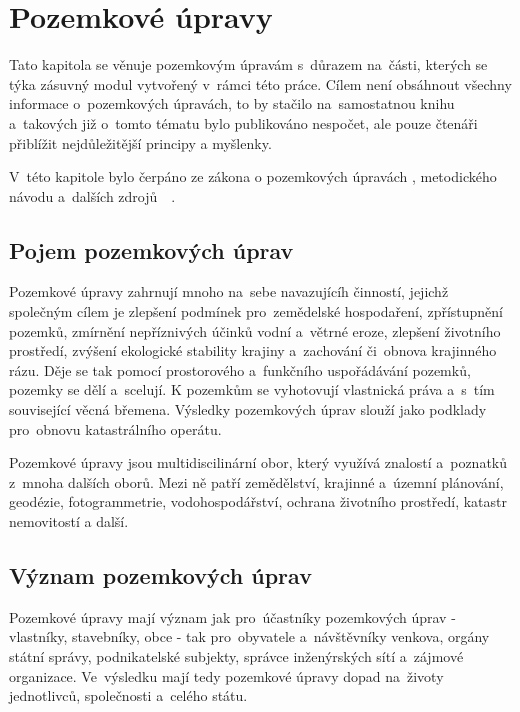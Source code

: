 \chapter{Pozemkové úpravy}
\label{pu}

Tato kapitola se věnuje pozemkovým úpravám s~důrazem na~části, kterých se týka zásuvný modul vytvořený v~rámci této práce. Cílem není obsáhnout všechny informace o~pozemkových úpravách, to by stačilo na~samostatnou knihu a~takových již o~tomto tématu bylo publikováno nespočet, ale pouze čtenáři přiblížit nejdůležitější principy a myšlenky.

V~této kapitole bylo čerpáno ze zákona o pozemkových úpravách \citep{pu_zakon}, metodického návodu \citep{metodicky_navod} a~dalších zdrojů~\citep{pu_skripta}~\citep{pu_cr}.

\section{Pojem pozemkových úprav}
\label{pojem_pu}

Pozemkové úpravy zahrnují mnoho na~sebe navazujícíh činností, jejichž společným cílem je zlepšení podmínek pro~zemědelské hospodaření, zpřístupnění pozemků, zmírnění nepříznivých účinků vodní a~větrné eroze, zlepšení životního prostředí, zvýšení ekologické stability krajiny a~zachování či~obnova krajinného rázu. Děje se tak pomocí prostorového a~funkčního uspořádávání pozemků, pozemky se dělí a~scelují. K pozemkům se vyhotovují vlastnická práva a~s~tím související věcná břemena. Výsledky pozemkových úprav slouží jako podklady pro~obnovu katastrálního operátu.

Pozemkové úpravy jsou multidiscilinární obor, který využívá znalostí a~poznatků z~mnoha dalších oborů. Mezi ně patří zemědělství, krajinné a~územní plánování, geodézie, fotogrammetrie, vodohospodářství, ochrana životního prostředí, katastr nemovitostí a další.

\section{Význam pozemkových úprav}
\label{vyznam_pu}

Pozemkové úpravy mají význam jak pro~účastníky pozemkových úprav - vlastníky, stavebníky, obce - tak pro~obyvatele a~návštěvníky venkova, orgány státní správy, podnikatelské subjekty, správce inženýrských sítí a~zájmové organizace. Ve~výsledku mají tedy pozemkové úpravy dopad na~životy jednotlivců, společnosti a~celého státu.

